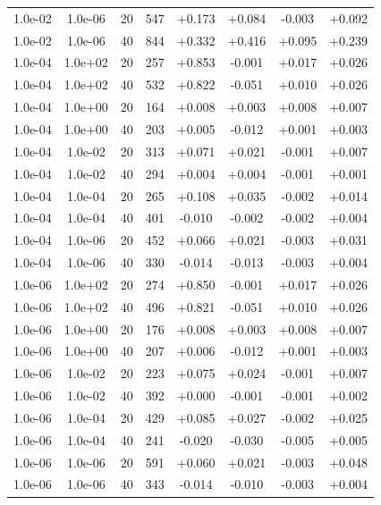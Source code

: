 \documentclass[11pt,a4paper]{article}
\begin{document}
\begin{table}
\begin{tabular}{*{8}c}
 1.0e-02 	 & 1.0e-06 	 & 20 & 547 	 & +0.173 & +0.084 & -0.003 & +0.092 \\
 1.0e-02 	 & 1.0e-06 	 & 40 & 844 	 & +0.332 & +0.416 & +0.095 & +0.239 \\ 
 \hline 
 1.0e-04 	 & 1.0e+02 	 & 20 & 257 	 & +0.853 & -0.001 & +0.017 & +0.026 \\ 
 1.0e-04 	 & 1.0e+02 	 & 40 & 532 	 & +0.822 & -0.051 & +0.010 & +0.026 \\ 
 1.0e-04 	 & 1.0e+00 	 & 20 & 164 	 & +0.008 & +0.003 & +0.008 & +0.007 \\ 
 1.0e-04 	 & 1.0e+00 	 & 40 & 203 	 & +0.005 & -0.012 & +0.001 & +0.003 \\  
 1.0e-04 	 & 1.0e-02 	 & 20 & 313 	 & +0.071 & +0.021 & -0.001 & +0.007 \\ 
 1.0e-04 	 & 1.0e-02 	 & 40 & 294 	 & +0.004 & +0.004 & -0.001 & +0.001 \\ 
 1.0e-04 	 & 1.0e-04 	 & 20 & 265 	 & +0.108 & +0.035 & -0.002 & +0.014 \\
 1.0e-04 	 & 1.0e-04 	 & 40 & 401 	 & -0.010 & -0.002 & -0.002 & +0.004 \\ 
 1.0e-04 	 & 1.0e-06 	 & 20 & 452 	 & +0.066 & +0.021 & -0.003 & +0.031 \\ 
 1.0e-04 	 & 1.0e-06 	 & 40 & 330 	 & -0.014 & -0.013 & -0.003 & +0.004 \\ 
 \hline
 1.0e-06 	 & 1.0e+02 	 & 20 & 274 	 & +0.850 & -0.001 & +0.017 & +0.026 \\ 
 1.0e-06 	 & 1.0e+02 	 & 40 & 496 	 & +0.821 & -0.051 & +0.010 & +0.026 \\
 1.0e-06 	 & 1.0e+00 	 & 20 & 176 	 & +0.008 & +0.003 & +0.008 & +0.007 \\ 
 1.0e-06 	 & 1.0e+00 	 & 40 & 207 	 & +0.006 & -0.012 & +0.001 & +0.003 \\ 
 1.0e-06 	 & 1.0e-02 	 & 20 & 223 	 & +0.075 & +0.024 & -0.001 & +0.007 \\ 
 1.0e-06 	 & 1.0e-02 	 & 40 & 392 	 & +0.000 & -0.001 & -0.001 & +0.002 \\ 
 1.0e-06 	 & 1.0e-04 	 & 20 & 429 	 & +0.085 & +0.027 & -0.002 & +0.025 \\ 
 1.0e-06 	 & 1.0e-04 	 & 40 & 241 	 & -0.020 & -0.030 & -0.005 & +0.005 \\ 
 1.0e-06 	 & 1.0e-06 	 & 20 & 591 	 & +0.060 & +0.021 & -0.003 & +0.048 \\ 
 1.0e-06 	 & 1.0e-06 	 & 40 & 343 	 & -0.014 & -0.010 & -0.003 & +0.004 \\ 

\end{tabular}
\end{table}
\end{document}

